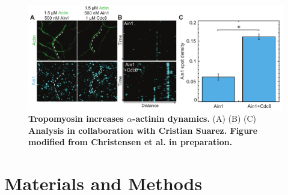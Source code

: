 \begin{figure}
\centering
\includegraphics[width=\textwidth]{img/ch03/Thesis_aact_dynamics.pdf}
\caption[Tropomyosin increases \texorpdfstring{$\alpha$}{alpha}-actinin dynamics.]{\textbf{Tropomyosin increases $\alpha$-actinin dynamics.} (A) (B) (C) \textbf{Analysis in collaboration with Cristian Suarez. Figure modified from Christensen et al. in preparation.}}
\label{fig:tropo_aact}
\end{figure}

\section{Materials and Methods}


